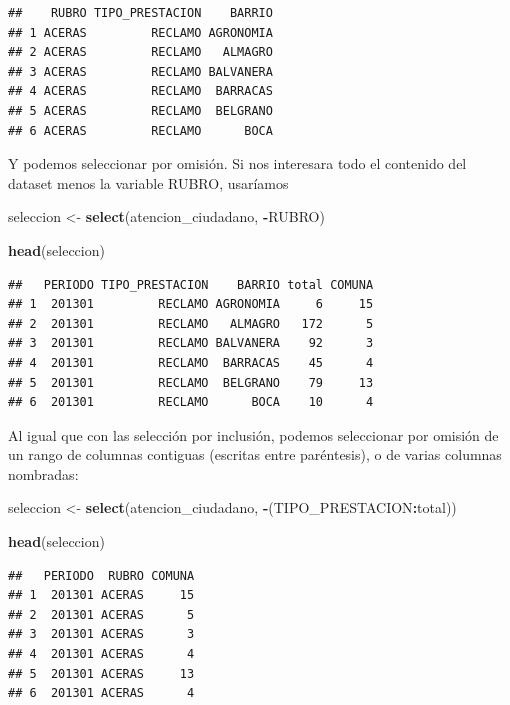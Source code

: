 \documentclass[]{book}
\newenvironment{Shaded}{\begin{snugshade}}{\end{snugshade}}
\newcommand{\KeywordTok}[1]{\textcolor[rgb]{0.13,0.29,0.53}{\textbf{#1}}}
\newcommand{\StringTok}[1]{\textcolor[rgb]{0.31,0.60,0.02}{#1}}
\newcommand{\OperatorTok}[1]{\textcolor[rgb]{0.81,0.36,0.00}{\textbf{#1}}}
\newcommand{\NormalTok}[1]{#1}
\begin{document}
\begin{verbatim}
##    RUBRO TIPO_PRESTACION    BARRIO
## 1 ACERAS         RECLAMO AGRONOMIA
## 2 ACERAS         RECLAMO   ALMAGRO
## 3 ACERAS         RECLAMO BALVANERA
## 4 ACERAS         RECLAMO  BARRACAS
## 5 ACERAS         RECLAMO  BELGRANO
## 6 ACERAS         RECLAMO      BOCA
\end{verbatim}

Y podemos seleccionar por omisión. Si nos interesara todo el contenido
del dataset menos la variable RUBRO, usaríamos

\begin{Shaded}
\begin{Highlighting}[]
\NormalTok{seleccion <-}\StringTok{ }\KeywordTok{select}\NormalTok{(atencion_ciudadano, }\OperatorTok{-}\NormalTok{RUBRO)}

\KeywordTok{head}\NormalTok{(seleccion)}
\end{Highlighting}
\end{Shaded}

\begin{verbatim}
##   PERIODO TIPO_PRESTACION    BARRIO total COMUNA
## 1  201301         RECLAMO AGRONOMIA     6     15
## 2  201301         RECLAMO   ALMAGRO   172      5
## 3  201301         RECLAMO BALVANERA    92      3
## 4  201301         RECLAMO  BARRACAS    45      4
## 5  201301         RECLAMO  BELGRANO    79     13
## 6  201301         RECLAMO      BOCA    10      4
\end{verbatim}

Al igual que con las selección por inclusión, podemos seleccionar por
omisión de un rango de columnas contiguas (escritas entre paréntesis), o
de varias columnas nombradas:

\begin{Shaded}
\begin{Highlighting}[]
\NormalTok{seleccion <-}\StringTok{ }\KeywordTok{select}\NormalTok{(atencion_ciudadano, }\OperatorTok{-}\NormalTok{(TIPO_PRESTACION}\OperatorTok{:}\NormalTok{total))}

\KeywordTok{head}\NormalTok{(seleccion)}
\end{Highlighting}
\end{Shaded}

\begin{verbatim}
##   PERIODO  RUBRO COMUNA
## 1  201301 ACERAS     15
## 2  201301 ACERAS      5
## 3  201301 ACERAS      3
## 4  201301 ACERAS      4
## 5  201301 ACERAS     13
## 6  201301 ACERAS      4
\end{verbatim}
\end{document}
